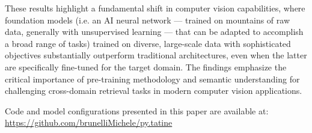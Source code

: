 These results highlight a fundamental shift in computer vision capabilities, where foundation models (i.e. an AI neural network — trained on mountains of raw data, generally with unsupervised learning — that can be adapted to accomplish a broad range of tasks) trained on diverse, large-scale data with sophisticated objectives substantially outperform traditional architectures, even when the latter are specifically fine-tuned for the target domain. 
The findings emphasize the critical importance of pre-training methodology and semantic understanding for challenging cross-domain retrieval tasks in modern computer vision applications.

Code and model configurations presented in this paper are available at: \url{https://github.com/brunelliMichele/py.tatine}

